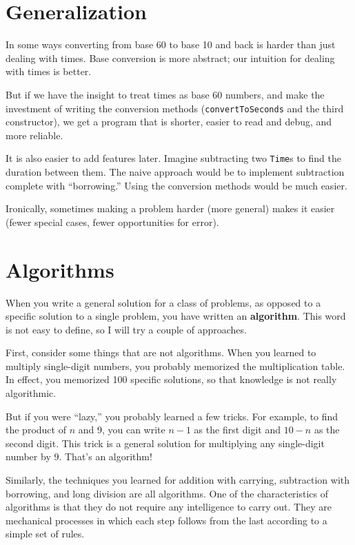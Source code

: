 \documentclass[12pt]{book}
\theoremstyle{definition}
\begin{document}
\section{Generalization}

In some ways converting from base 60 to base 10 and back is
harder than just dealing with times.  Base conversion is more
abstract; our intuition for dealing with times is better.

But if we have the insight to treat times as base 60 numbers,
and make the investment of writing the conversion methods
({\tt convertToSeconds} and the third constructor), we get
a program that is shorter, easier to read and debug, and more
reliable.

It is also easier to add features later.  Imagine
subtracting two {\tt Time}s to find the duration between them.  The
naive approach would be to implement subtraction complete with
``borrowing.''  Using the conversion methods would be much easier.

Ironically, sometimes making a problem harder (more general)
makes it easier (fewer special cases, fewer opportunities for error).


\section{Algorithms}
\label{algorithm}

When you write a general solution for a class of problems, as
opposed to a specific solution to a single problem, you have
written an {\bf algorithm}.  This word is
not easy to define, so I will try a couple of approaches.

First, consider some things that are not algorithms.  When you learned
to multiply single-digit numbers, you probably memorized the
multiplication table.  In effect, you memorized 100 specific
solutions, so that knowledge is not really algorithmic.

But if you were ``lazy,'' you probably learned a few
tricks.  For example, to find the product of $n$ and 9, you can
write $n-1$ as the first digit and $10-n$ as the second digit.  This
trick is a general solution for multiplying any single-digit number by 9.
That's an algorithm!

Similarly, the techniques you learned for addition with carrying,
subtraction with borrowing, and long division are all algorithms.  One
of the characteristics of algorithms is that they do not require any
intelligence to carry out.  They are mechanical processes in which
each step follows from the last according to a simple set of rules.
\end{document}
